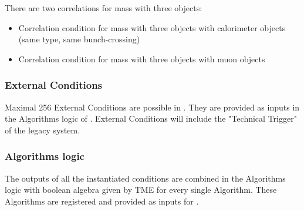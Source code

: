 There are two correlations for mass with three objects:
\begin{itemize}
\item Correlation condition for mass with three objects with calorimeter objects (same type, same bunch-crossing)\\
\item Correlation condition for mass with three objects with muon objects\\
\end{itemize}

\subsubsection{External Conditions}
\label{sec:gtl:external_conditions}
Maximal 256 External Conditions are possible in \gt. They are provided as inputs in the Algorithms logic of \ugtl.
External Conditions will include the "Technical Trigger" of the legacy system.

\subsubsection{Algorithms logic}
\label{sec:gtl:algorithms_logic}

The outputs of all the instantiated conditions are combined in the Algorithms logic with boolean algebra given by TME for every single Algorithm. These Algorithms are registered and provided as inputs for \fdl.

\clearpage
